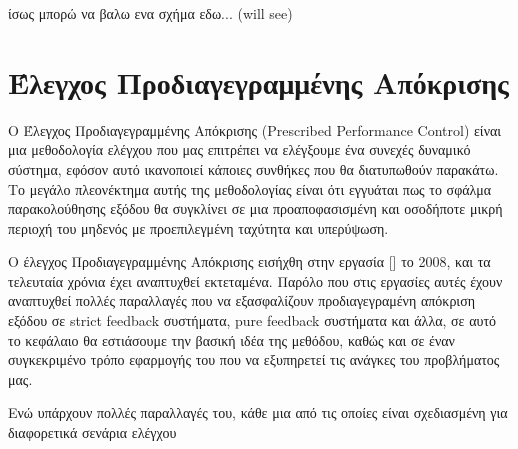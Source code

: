 ίσως μπορώ να βαλω ενα σχήμα εδω... (will see)

\section{Έλεγχος Προδιαγεγραμμένης Απόκρισης}
Ο Έλεγχος Προδιαγεγραμμένης Απόκρισης (Prescribed Performance Control) είναι μια μεθοδολογία ελέγχου που μας επιτρέπει να ελέγξουμε ένα συνεχές δυναμικό σύστημα, εφόσον αυτό ικανοποιεί κάποιες συνθήκες που θα διατυπωθούν παρακάτω. Το μεγάλο πλεονέκτημα αυτής της μεθοδολογίας είναι ότι εγγυάται πως το σφάλμα παρακολούθησης εξόδου θα συγκλίνει σε μια προαποφασισμένη και οσοδήποτε μικρή περιοχή του μηδενός με προεπιλεγμένη ταχύτητα και υπερύψωση.

Ο έλεγχος Προδιαγεγραμμένης Απόκρισης εισήχθη στην εργασία [] το 2008, και τα τελευταία χρόνια έχει αναπτυχθεί εκτεταμένα. Παρόλο που στις εργασίες αυτές έχουν αναπτυχθεί πολλές παραλλαγές που να εξασφαλίζουν προδιαγεγραμένη απόκριση εξόδου σε strict feedback συστήματα, pure feedback συστήματα και άλλα, σε αυτό το κεφάλαιο θα εστιάσουμε την βασική ιδέα της μεθόδου, καθώς και σε έναν συγκεκριμένο τρόπο εφαρμογής του που να εξυπηρετεί τις ανάγκες του προβλήματος μας.

Ενώ υπάρχουν πολλές παραλλαγές του, κάθε μια από τις οποίες είναι σχεδιασμένη για διαφορετικά σενάρια ελέγχου